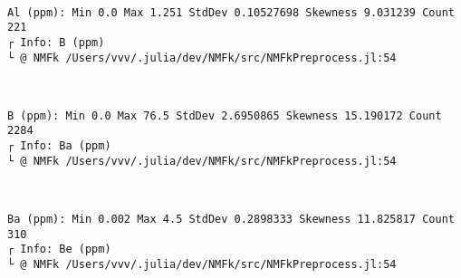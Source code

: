 \documentclass[11pt]{article}
\begin{document}
    \begin{center}
    \end{center}
    { \hspace*{\fill} \\}
    
    \begin{Verbatim}[commandchars=\\\{\}]
Al (ppm): Min 0.0 Max 1.251 StdDev 0.10527698 Skewness 9.031239 Count 221
┌ Info: B (ppm)
└ @ NMFk /Users/vvv/.julia/dev/NMFk/src/NMFkPreprocess.jl:54
    \end{Verbatim}

    \begin{center}
    \end{center}
    { \hspace*{\fill} \\}
    
    \begin{Verbatim}[commandchars=\\\{\}]
B (ppm): Min 0.0 Max 76.5 StdDev 2.6950865 Skewness 15.190172 Count 2284
┌ Info: Ba (ppm)
└ @ NMFk /Users/vvv/.julia/dev/NMFk/src/NMFkPreprocess.jl:54
    \end{Verbatim}

    \begin{center}
    \end{center}
    { \hspace*{\fill} \\}
    
    \begin{Verbatim}[commandchars=\\\{\}]
Ba (ppm): Min 0.002 Max 4.5 StdDev 0.2898333 Skewness 11.825817 Count 310
┌ Info: Be (ppm)
└ @ NMFk /Users/vvv/.julia/dev/NMFk/src/NMFkPreprocess.jl:54
    \end{Verbatim}

    \begin{center}
    \end{center}
    { \hspace*{\fill} \\}
    
\end{document}
